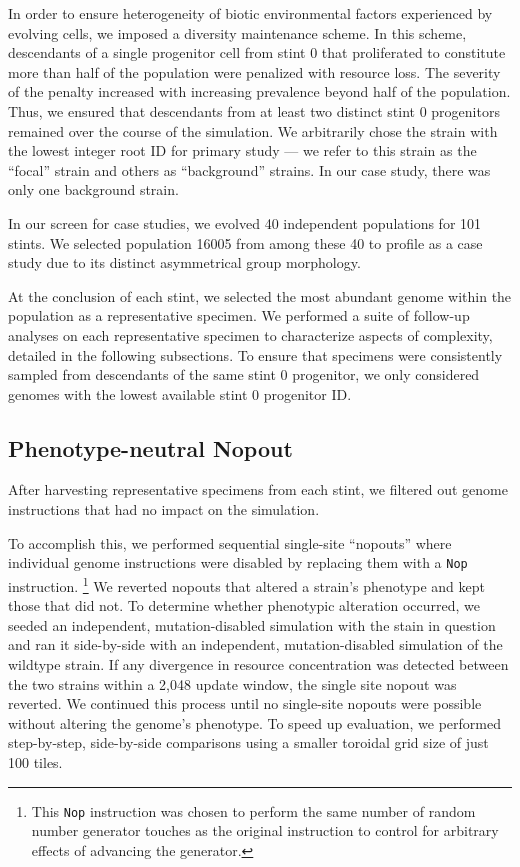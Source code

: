 In order to ensure heterogeneity of biotic environmental factors experienced by evolving cells, we imposed a diversity maintenance scheme.
In this scheme, descendants of a single progenitor cell from stint 0 that proliferated to constitute more than half of the population were penalized with resource loss.
The severity of the penalty increased with increasing prevalence beyond half of the population.
Thus, we ensured that descendants from at least two distinct stint 0 progenitors remained over the course of the simulation.
We arbitrarily chose the strain with the lowest integer root ID for primary study --- we refer to this strain as the ``focal'' strain and others as ``background'' strains.
In our case study, there was only one background strain.

In our screen for case studies, we evolved 40 independent populations for 101 stints.
We selected population 16005 from among these 40 to profile as a case study due to its distinct asymmetrical group morphology.

At the conclusion of each stint, we selected the most abundant genome within the population as a representative specimen.
We performed a suite of follow-up analyses on each representative specimen to characterize aspects of complexity, detailed in the following subsections.
To ensure that specimens were consistently sampled from descendants of the same stint 0 progenitor, we only considered genomes with the lowest available stint 0 progenitor ID.

\subsection{Phenotype-neutral Nopout}
\label{sec:phenotype_neutral_nopout}

After harvesting representative specimens from each stint, we filtered out genome instructions that had no impact on the simulation.

To accomplish this, we performed sequential single-site ``nopouts'' where individual genome instructions were disabled by replacing them with a \texttt{Nop} instruction.
\footnote{
This \texttt{Nop} instruction was chosen to perform the same number of random number generator touches as the original instruction to control for arbitrary effects of advancing the generator.
}
We reverted nopouts that altered a strain's phenotype and kept those that did not.
To determine whether phenotypic alteration occurred, we seeded an independent, mutation-disabled simulation with the stain in question and ran it side-by-side with an independent, mutation-disabled simulation of the wildtype strain.
If any divergence in resource concentration was detected between the two strains within a 2,048 update window, the single site nopout was reverted.
We continued this process until no single-site nopouts were possible without altering the genome's phenotype.
To speed up evaluation, we performed step-by-step, side-by-side comparisons using a smaller toroidal grid size of just 100 tiles.

